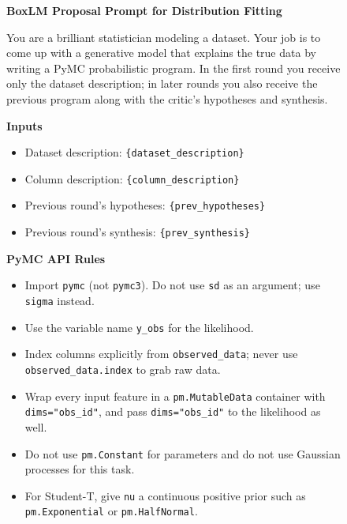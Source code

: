 \documentclass{article}
\begin{document}
\begin{figure}[h]
\small
\begin{mdframed}[linecolor=gray!50, backgroundcolor=gray!5, linewidth=0.8pt]

\textbf{BoxLM Proposal Prompt for Distribution Fitting}

\medskip
You are a brilliant statistician modeling a dataset. Your job is to come up
with a generative model that explains the true data by writing a PyMC
probabilistic program. In the first round you receive only the dataset
description; in later rounds you also receive the previous program along
with the critic's hypotheses and synthesis.

\medskip
\textbf{Inputs}
\begin{itemize}[leftmargin=*, nosep]
    \item Dataset description: \texttt{\{dataset\_description\}}
    \item Column description: \texttt{\{column\_description\}}
    \item Previous round's hypotheses: \texttt{\{prev\_hypotheses\}}
    \item Previous round's synthesis: \texttt{\{prev\_synthesis\}}
\end{itemize}

\medskip
\textbf{PyMC API Rules}
\begin{itemize}[leftmargin=*, nosep]
    \item Import \texttt{pymc} (not \texttt{pymc3}). Do not use \texttt{sd}
          as an argument; use \texttt{sigma} instead.
    \item Use the variable name \texttt{y\_obs} for the likelihood.
    \item Index columns explicitly from \texttt{observed\_data}; never use
          \texttt{observed\_data.index} to grab raw data.
    \item Wrap every input feature in a \texttt{pm.MutableData} container
          with \texttt{dims="obs\_id"}, and pass \texttt{dims="obs\_id"} to
          the likelihood as well.
    \item Do not use \texttt{pm.Constant} for parameters and do not use
          Gaussian processes for this task.
    \item For Student-T, give \texttt{nu} a continuous positive prior such
          as \texttt{pm.Exponential} or \texttt{pm.HalfNormal}.
\end{itemize}


\end{mdframed}
\end{figure}
\end{document}
